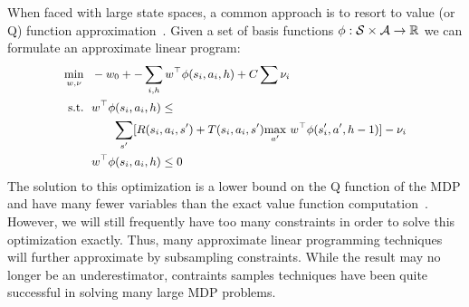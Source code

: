 When faced with large state spaces, a common approach is to resort to value (or Q) function approximation~\cite{schweitzer1985generalized}. 
Given a set of basis functions $\phi: \mathcal{S}{}\times \mathcal{A}{} \rightarrow \mathbb{R}$ we can formulate an approximate linear program:
\begin{equation}
{\footnotesize
\begin{aligned}
\underset{w, \nu}{\min}\ \    &-w_0 + -\sum_{i, h} w^\top \phi(s_i, a_i, h) + C\sum \nu_i\\
\text{s.t.}\ \   &w^\top \phi(\statevar{}_i, \actionvar{}_i, h) \leq \\ &\ \ \ \ \ \ \underset{s'}{\sum}[R(s_i, a_i, s') + T(s_i, a_i, s')\underset{a'}{\max}\ w^\top \phi(\statevar{}'_i, \actionvar{}', h-1)] -  \nu_i \\
&w^\top \phi(\statevar{}_i, \actionvar{}_i, h) \leq 0
\end{aligned}}
\end{equation}
The solution to this optimization is a lower bound on the Q function of the MDP and have many fewer variables than the exact value function computation~\cite{puterman1994}.
However, we will still frequently have too many constraints in order to solve this optimization exactly.
Thus, many approximate linear programming techniques will further approximate by subsampling constraints.
While the result may no longer be an underestimator, contraints samples techniques have been quite successful in solving many large MDP problems.


